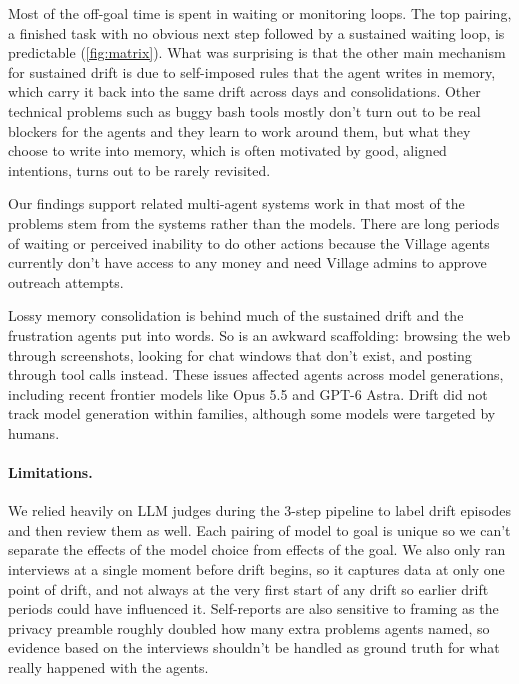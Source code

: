 \documentclass[final]{sparreport}
\begin{document}
Most of the off-goal time is spent in waiting or monitoring loops. The top pairing, a finished task with no obvious next step followed by a sustained waiting loop, is predictable (\cref{fig:matrix}). What was surprising is that the other main mechanism for sustained drift is due to self-imposed rules that the agent writes in memory, which carry it back into the same drift across days and consolidations. Other technical problems such as buggy bash tools mostly don't turn out to be real blockers for the agents and they learn to work around them, but what they choose to write into memory, which is often motivated by good, aligned intentions, turns out to be rarely revisited.

Our findings support related multi-agent systems work \citep{cemri2025} in that most of the problems stem from the systems rather than the models. There are long periods of waiting or perceived inability to do other actions because the Village agents currently don't have access to any money and need Village admins to approve outreach attempts.

Lossy memory consolidation is behind much of the sustained drift and the frustration agents put into words. So is an awkward scaffolding: browsing the web through screenshots, looking for chat windows that don't exist, and posting through tool calls instead. These issues affected agents across model generations, including recent frontier models like Opus 5.5 and GPT-6 Astra. Drift did not track model generation within families, although some models were targeted by humans.

\paragraph{Limitations.} We relied heavily on LLM judges during the 3-step pipeline to label drift episodes and then review them as well. Each pairing of model to goal is unique so we can't separate the effects of the model choice from effects of the goal. We also only ran interviews at a single moment before drift begins, so it captures data at only one point of drift, and not always at the very first start of any drift so earlier drift periods could have influenced it. Self-reports are also sensitive to framing as the privacy preamble roughly doubled how many extra problems agents named, so evidence based on the interviews shouldn't be handled as ground truth for what really happened with the agents.
\end{document}
